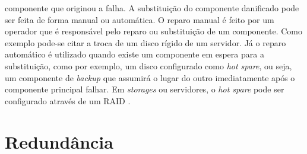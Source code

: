 \begin{itemize}
 componente que originou a falha. A substituição do componente danificado pode ser feita de forma manual ou automática. 
 O reparo manual é feito por um operador que é responsável pelo reparo ou substituição de um componente. Como exemplo pode-se citar
 a troca de um disco rígido de um servidor. Já o reparo automático é utilizado quando existe um componente em espera para a substituição, 
 como por exemplo, um disco configurado como \textit{hot spare}, ou seja, um componente de \textit{backup} que assumirá o lugar do 
 outro imediatamente após o componente principal falhar. Em \textit{storages} ou servidores, o \textit{hot spare} pode ser configurado 
 através de um \ac{RAID} \cite{rouse2013}.
\end{itemize}

\section{Redundância}
\label{section:redundancia}

